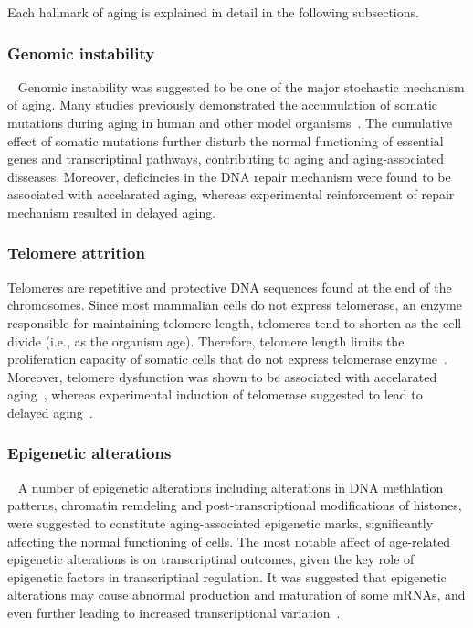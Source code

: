 Each hallmark of aging is explained in detail in the following subsections.
\subsubsection{Genomic instability}~\label{hmark:genomic.instability}
Genomic instability was suggested to be one of the major stochastic mechanism of aging. 
Many studies previously demonstrated the accumulation of somatic mutations during aging in human and other model organisms~\cite{Moskalev2013,Lodato2018,Lombard2005,Vijg2004,Lu2004}.
The cumulative effect of somatic mutations further disturb the normal functioning of essential genes and transcriptinal pathways, contributing to aging and aging-associated disseases.
Moreover, deficincies in the DNA repair mechanism were found to be associated with accelarated aging, whereas experimental reinforcement of repair mechanism resulted in delayed aging.

\subsubsection{Telomere attrition}
Telomeres are repetitive and protective DNA sequences found at the end of the chromosomes.
Since most mammalian cells do not express telomerase, an enzyme responsible for maintaining telomere length, 
telomeres tend to shorten as the cell divide (i.e., as the organism age). 
Therefore, telomere length limits the proliferation capacity of somatic cells that do not express telomerase enzyme~\cite{Blasco2007}.
Moreover, telomere dysfunction was shown to be associated with accelarated aging~\cite{Armanios2009}, 
whereas experimental induction of telomerase suggested to lead to delayed aging~\cite{Tomas2008}.

\subsubsection{Epigenetic alterations}~\label{hmark:epigenetic}
A number of epigenetic alterations including alterations in DNA methlation patterns, chromatin remdeling and post-transcriptional modifications of histones, 
were suggested to constitute aging-associated epigenetic marks, significantly affecting the normal functioning of cells.
The most notable affect of age-related epigenetic alterations is on transcriptinal outcomes, given the key role of epigenetic factors in transcriptinal regulation.
It was suggested that epigenetic alterations may cause abnormal production and maturation of some mRNAs, and even further leading to increased transcriptional variation~\cite{Lopez2013}.

